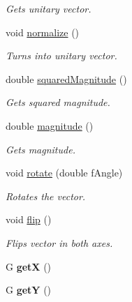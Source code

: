 \begin{DoxyCompactItemize}
\begin{DoxyCompactList}\small\item\em Gets unitary vector. \end{DoxyCompactList}\item 
\hypertarget{class_vector2_d_a0de406dcf396cb5b629bf196c1101621}{}void \hyperlink{class_vector2_d_a0de406dcf396cb5b629bf196c1101621}{normalize} ()\label{class_vector2_d_a0de406dcf396cb5b629bf196c1101621}

\begin{DoxyCompactList}\small\item\em Turns into unitary vector. \end{DoxyCompactList}\item 
double \hyperlink{class_vector2_d_af4162d18ba5939bd0175ae01ad6f0221}{squared\+Magnitude} ()
\begin{DoxyCompactList}\small\item\em Gets squared magnitude. \end{DoxyCompactList}\item 
\hypertarget{class_vector2_d_aab76e76bb642784480bdd231b90b1273}{}double \hyperlink{class_vector2_d_aab76e76bb642784480bdd231b90b1273}{magnitude} ()\label{class_vector2_d_aab76e76bb642784480bdd231b90b1273}

\begin{DoxyCompactList}\small\item\em Gets magnitude. \end{DoxyCompactList}\item 
void \hyperlink{class_vector2_d_a85f594928169b9c4bb74cc26ab43d111}{rotate} (double f\+Angle)
\begin{DoxyCompactList}\small\item\em Rotates the vector. \end{DoxyCompactList}\item 
\hypertarget{class_vector2_d_a6191843e792557d9532da82b79b026aa}{}void \hyperlink{class_vector2_d_a6191843e792557d9532da82b79b026aa}{flip} ()\label{class_vector2_d_a6191843e792557d9532da82b79b026aa}

\begin{DoxyCompactList}\small\item\em Flips vector in both axes. \end{DoxyCompactList}\item 
\hypertarget{class_vector2_d_a46521876fbb0b52881eba97a074ba59c}{}G {\bfseries get\+X} ()\label{class_vector2_d_a46521876fbb0b52881eba97a074ba59c}

\item 
\hypertarget{class_vector2_d_ac0ecf6cdb4b8106b8c1c2a08efc728df}{}G {\bfseries get\+Y} ()\label{class_vector2_d_ac0ecf6cdb4b8106b8c1c2a08efc728df}


\end{DoxyCompactItemize}
